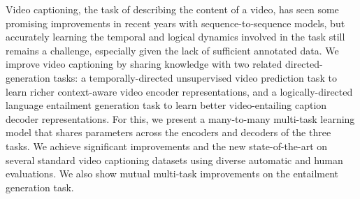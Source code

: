 Video captioning, the task of describing the content of a video, has seen some promising improvements in recent years with sequence-to-sequence models, but accurately learning the temporal and logical dynamics involved in the task still remains a challenge, especially given the lack of sufficient annotated data. We improve video captioning by sharing knowledge with two related directed-generation tasks: a temporally-directed unsupervised video prediction task to learn richer context-aware video encoder representations, and a logically-directed language entailment generation task to learn better video-entailing caption decoder representations. For this, we present a many-to-many multi-task learning model that shares parameters across the encoders and decoders of the three tasks. We achieve significant improvements and the new state-of-the-art on several standard video captioning datasets using diverse automatic and human evaluations. We also show mutual multi-task improvements on the entailment generation task.
